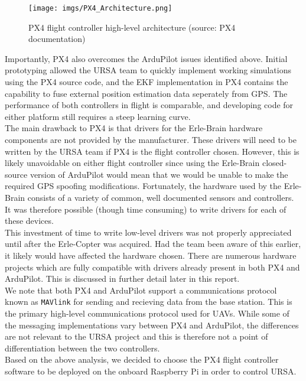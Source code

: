 \documentclass[capstone_report.tex]{subfiles}
\begin{document}
    \begin{figure}[H]
        \centering
        \texttt{[image: imgs/PX4\_Architecture.png]}
        \caption{PX4 flight controller high-level architecture (source: PX4 documentation)\label{fig:PX4Arch}}
    \end{figure}

    Importantly, PX4 also overcomes the ArduPilot issues identified above. Initial prototyping allowed the URSA team to quickly implement working simulations using the PX4 source code, and the EKF implementation in PX4 contains the capability to fuse external position estimation data seperately from GPS. The performance of both controllers in flight is comparable, and developing code for either platform still requires a steep learning curve. \\

    The main drawback to PX4 is that drivers for the Erle-Brain hardware components are not provided by the manufacturer. These drivers will need to be written by the URSA team if PX4 is the flight controller chosen. However, this is likely unavoidable on either flight controller since using the Erle-Brain closed-source version of ArduPilot would mean that we would be unable to make the required GPS spoofing modifications. Fortunately, the hardware used by the Erle-Brain consists of a variety of common, well documented sensors and controllers. It was therefore possible (though time consuming) to write drivers for each of these devices.\\

    This investment of time to write low-level drivers was not properly appreciated until after the Erle-Copter was acquired. Had the team been aware of this earlier, it likely would have affected the hardware chosen. There are numerous hardware projects which are fully compatible with drivers already present in both PX4 and ArduPilot. This is discussed in further detail later in this report.\\

    We note that both PX4 and ArduPilot support a communications protocol known as \texttt{MAVlink} for sending and recieving data from the base station. This is the primary high-level communications protocol used for UAVs. While some of the messaging implementations vary between PX4 and ArduPilot, the differences are not relevant to the URSA project and this is therefore not a point of differentiation between the two controllers. \\

    Based on the above analysis, we decided to choose the PX4 flight controller software to be deployed on the onboard Raspberry Pi in order to control URSA.
\end{document}
